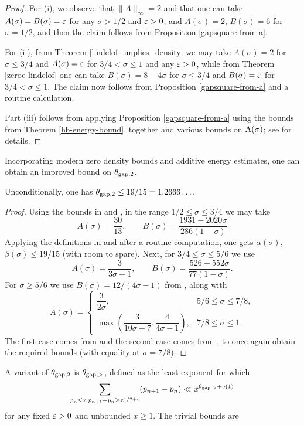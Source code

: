 \begin{proof} For (i), we observe that $\|A\|_\infty=2$ and that one can take $A(\sigma)=B(\sigma)=\varepsilon$ for any $\sigma>1/2$ and $\varepsilon>0$, and $A(\sigma)=2$, $B(\sigma)=6$ for $\sigma=1/2$, and then the claim follows from Proposition \ref{gapsquare-from-a}.

For (ii), from Theorem \ref{lindelof_implies_density} we may take $A(\sigma)=2$ for $\sigma \leq 3/4$ and $A(\sigma)=\varepsilon$ for $3/4 < \sigma \leq 1$ and any $\varepsilon>0$, while from Theorem \ref{zeroe-lindelof} one can take $B(\sigma) = 8-4\sigma$ for $\sigma \leq 3/4$ and $B(\sigma)=\varepsilon$ for $3/4 < \sigma \leq 1$.  The claim now follows from Proposition \ref{gapsquare-from-a} and a routine calculation.

Part (iii) follows from applying Proposition \ref{gapsquare-from-a} using the bounds from Theorem \ref{hb-energy-bound}, together and various bounds on $\mathrm{A}(\sigma)$; see \cite[Theorem 12.14]{ivic} for details. 
\end{proof}

Incorporating modern zero density bounds and additive energy estimates, one can obtain an improved bound on $\theta_{\mathrm{gap},2}$. 
\begin{theorem}
Unconditionally, one has $\theta_{\mathrm{gap},2} \le 19/15 = 1.2666\ldots$. 
\end{theorem}

\derived 
{}

\begin{proof}
Using the bounds in  and , in the range $1/2 \le \sigma \le 3/4$ we may take 
\[
A(\sigma) = \frac{30}{13}, \qquad B(\sigma) = \frac{1931 - 2020\sigma}{286(1 - \sigma)}
\]
Applying the definitions in  and after a routine computation, one gets $\alpha(\sigma)$, $\beta(\sigma) \le 19/15$ (with room to spare). Next, for $3/4 \le \sigma \le 5/6$ we use 
\[
A(\sigma) = \frac{3}{3\sigma - 1},\qquad B(\sigma) = \frac{526 - 552\sigma}{77(1 - \sigma)}.
\]
For $\sigma \ge 5/6$ we use $B(\sigma) = 12/(4\sigma - 1)$ from , along with 
\[
A(\sigma) = \begin{cases}
\dfrac{3}{2\sigma},&5/6 \le \sigma \le 7/8,\\
\max\left(\dfrac{3}{10\sigma - 7}, \dfrac{4}{4\sigma - 1}\right),& 7/8 \le \sigma \le 1.
\end{cases}
\]
The first case comes from  and the second case comes from , to once again obtain the required bounds (with equality at $\sigma = 7/8$). 
\end{proof}
A variant of $\theta_{\mathrm{gap},2}$ is $\theta_{\mathrm{gap},>}$, defined as the least exponent for which
$$ \sum_{p_n \leq x: p_{n+1}-p_n \geq x^{1/2+\varepsilon}} (p_{n+1}-p_n) \ll x^{\theta_{\mathrm{gap},>}+o(1)}$$
for any fixed $\varepsilon>0$ and unbounded $x \geq 1$.  The trivial bounds are

